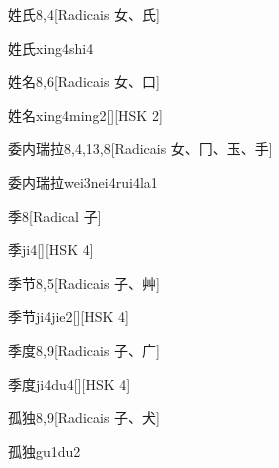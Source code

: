 \begin{entry}{姓氏}{8,4}[Radicais ⼥、⽒]
  \begin{phonetics}{姓氏}{xing4shi4}
  \end{phonetics}
\end{entry}

\begin{entry}{姓名}{8,6}[Radicais ⼥、⼝]
  \begin{phonetics}{姓名}{xing4ming2}[][HSK 2]
  \end{phonetics}
\end{entry}

\begin{entry}{委内瑞拉}{8,4,13,8}[Radicais ⼥、⼌、⽟、⼿]
  \begin{phonetics}{委内瑞拉}{wei3nei4rui4la1}
  \end{phonetics}
\end{entry}

\begin{entry}{季}{8}[Radical ⼦]
  \begin{phonetics}{季}{ji4}[][HSK 4]
  \end{phonetics}
\end{entry}

\begin{entry}{季节}{8,5}[Radicais ⼦、⾋]
  \begin{phonetics}{季节}{ji4jie2}[][HSK 4]
  \end{phonetics}
\end{entry}

\begin{entry}{季度}{8,9}[Radicais ⼦、⼴]
  \begin{phonetics}{季度}{ji4du4}[][HSK 4]
  \end{phonetics}
\end{entry}

\begin{entry}{孤独}{8,9}[Radicais ⼦、⽝]
  \begin{phonetics}{孤独}{gu1du2}
  \end{phonetics}
\end{entry}

